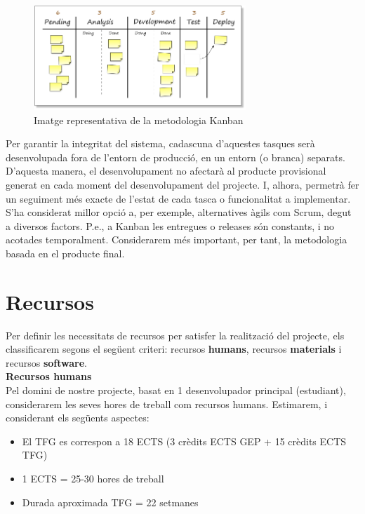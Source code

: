 \begin{figure}
\centering
\includegraphics[width=8cm]{Figures/Figure3}
\decoRule
\caption[Imatge representativa de la metodologia Kanban]{Imatge representativa de la metodologia Kanban}
\label{fig:Figura3}
\end{figure}

Per garantir la integritat del sistema, cadascuna d’aquestes tasques serà desenvolupada fora de l’entorn de producció, en un entorn (o branca) separats. D’aquesta manera, el desenvolupament no afectarà al producte provisional generat en cada moment del desenvolupament del projecte. I, alhora, permetrà fer un seguiment més exacte de l’estat de cada tasca o funcionalitat a implementar. \\

S’ha considerat millor opció a, per exemple, alternatives àgils com Scrum, degut a diversos factors. P.e., a Kanban les entregues o releases són constants, i no acotades temporalment\cite{kanban2}. Considerarem més important, per tant, la metodologia basada en el producte final. \\

\section{Recursos}

Per definir les necessitats de recursos per satisfer la realització del projecte, els classificarem segons el següent criteri: recursos \textbf{humans}, recursos \textbf{materials} i recursos \textbf{software}.\\

\noindent \textbf{\large Recursos humans}\\

\noindent Pel domini de nostre projecte, basat en 1 desenvolupador principal (estudiant), considerarem les seves hores de treball com recursos humans. Estimarem, i considerant els següents aspectes:

\begin{itemize}
\item El TFG es correspon a 18 ECTS (3 crèdits ECTS GEP + 15 crèdits ECTS TFG) \cite{tfg}
\item 1 ECTS = 25-30 hores de treball \cite{ects}
\item Durada aproximada TFG = 22 setmanes
\end{itemize}


